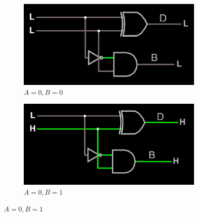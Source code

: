\documentclass{article}
\begin{document}
	\begin{figure}[H]
		\centering
		\begin{subfigure}[t]{0.4\textwidth}
			\centering
			\includegraphics[width=\textwidth]{half_sub/half_sub_00.png}
			\caption{$A=0, B=0$}
		\end{subfigure}
		\begin{subfigure}[t]{.4\textwidth}
			\centering
			\includegraphics[width=\textwidth]{half_sub/half_sub_01.png}
			\caption{$A=0, B=1$}
		\end{subfigure}
		

\end{figure}
\end{document}
